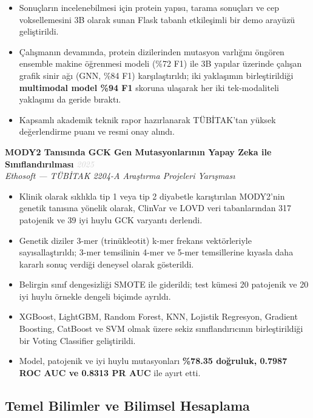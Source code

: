\documentclass[11pt,a4paper]{article}
\newcommand{\blueitem}[1]{\textcolor{subtitleblue}{\textbf{#1}}}
\newcommand{\daterange}[1]{\hfill \textcolor{lightgray}{\textit{#1}}}
\begin{document}
\begin{itemize}
    \item Sonuçların incelenebilmesi için protein yapısı, tarama sonuçları ve cep voksellemesini 3B olarak sunan Flask tabanlı etkileşimli bir demo arayüzü geliştirildi.
    \item Çalışmanın devamında, protein dizilerinden mutasyon varlığını öngören ensemble makine öğrenmesi modeli (\%72 F1) ile 3B yapılar üzerinde çalışan grafik sinir ağı (GNN, \%84 F1) karşılaştırıldı; iki yaklaşımın birleştirildiği \textbf{multimodal model \%94 F1} skoruna ulaşarak her iki tek-modaliteli yaklaşımı da geride bıraktı.
    \item Kapsamlı akademik teknik rapor hazırlanarak TÜBİTAK'tan yüksek değerlendirme puanı ve resmi onay alındı.
\end{itemize}

\blueitem{MODY2 Tanısında GCK Gen Mutasyonlarının Yapay Zeka ile Sınıflandırılması} \daterange{2025}\\
\textit{Ethosoft --- TÜBİTAK 2204-A Araştırma Projeleri Yarışması}
\begin{itemize}
    \item Klinik olarak sıklıkla tip 1 veya tip 2 diyabetle karıştırılan MODY2'nin genetik tanısına yönelik olarak, ClinVar ve LOVD veri tabanlarından 317 patojenik ve 39 iyi huylu GCK varyantı derlendi.
    \item Genetik diziler 3-mer (trinükleotit) k-mer frekans vektörleriyle sayısallaştırıldı; 3-mer temsilinin 4-mer ve 5-mer temsillerine kıyasla daha kararlı sonuç verdiği deneysel olarak gösterildi.
    \item Belirgin sınıf dengesizliği SMOTE ile giderildi; test kümesi 20 patojenik ve 20 iyi huylu örnekle dengeli biçimde ayrıldı.
    \item XGBoost, LightGBM, Random Forest, KNN, Lojistik Regresyon, Gradient Boosting, CatBoost ve SVM olmak üzere sekiz sınıflandırıcının birleştirildiği bir Voting Classifier geliştirildi.
    \item Model, patojenik ve iyi huylu mutasyonları \textbf{\%78.35 doğruluk, 0.7987 ROC AUC ve 0.8313 PR AUC} ile ayırt etti.
\end{itemize}

\subsection*{Temel Bilimler ve Bilimsel Hesaplama}
\end{document}

